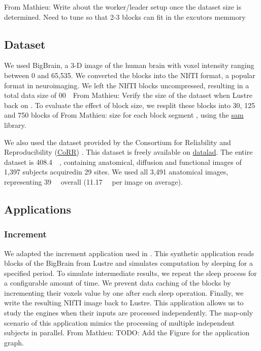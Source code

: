 \documentclass[conference]{IEEEtran}
\newcommand{\MD}[1]{\color{magenta}From Mathieu: #1 \color{black}}
\begin{document}
\MD{Write about the worker/leader setup once the dataset size is determined. Need to tune so that 2-3 blocks can fit in the excutors memmory}


\subsection{Dataset}
We used BigBrain\cite{Amunts:13}, a 3-D image of the human brain with voxel intensity ranging between 0 and 65,535.
We converted the blocks into the NIfTI format, a popular format in neuroimaging.
We left the NIfTI blocks uncompressed, resulting in a total data size of \SI{00}{\giga\byte}\MD{Verify the size of the dataset when Lustre back on}.
To evaluate the effect of block size, we resplit these blocks into 30, 125 and 750 blocks of \MD{size for each block segment}, using the \href{https://github.com/big-data-lab-team/sam}{sam} library.
	
We also used the dataset provided by the Consortium for Reliability and Reproducibility (\href{http://fcon_1000.projects.nitrc.org/indi/CoRR/html/}{CoRR}) \cite{zuo2014open}.
This dataset is freely available on \href{https://datasets.datalad.org/?dir=/corr/RawDataBIDS}{datalad}.
The entire dataset is \SI{408.4}{\giga\byte}, containing anatomical, diffusion and functional images of 1,397 subjects acquiredin 29 sites.
We used all 3,491 anatomical images, representing \SI{39}{\giga\byte} overall (\SI{11.17}{\mega\byte} per image on average).
	
\subsection{Applications}
\subsubsection{Increment}
We adapted the increment application used in \cite{hayot2019performance}.
This synthetic application reads blocks of the BigBrain from Lustre and simulates computation by sleeping for a specified period.
To simulate intermediate results, we repeat the sleep process for a configurable amount of time.
We prevent data caching of the blocks by incrementing their voxels value by one after each sleep operation.
Finally, we write the resulting NIfTI image back to Lustre.
This application allows us to study the engines when their inputs are processed independently.
The map-only scenario of this application mimics the processing of multiple independent subjects in parallel.
\MD{TODO: Add the Figure for the application graph.}
	
\end{document}
